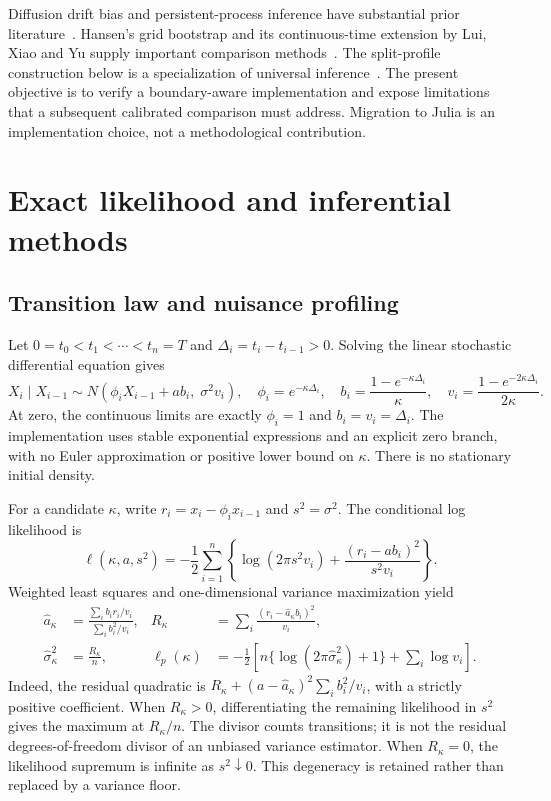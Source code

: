 \documentclass[11pt]{article}
\begin{document}
Diffusion drift bias and persistent-process inference have substantial prior
literature~\cite{tangchen,yu}. Hansen's grid bootstrap and its continuous-time
extension by Lui, Xiao and Yu supply important comparison
methods~\cite{hansen,lui}. The split-profile construction below is a
specialization of universal inference~\cite{universal}. The present objective
is to verify a boundary-aware implementation and expose limitations that a
subsequent calibrated comparison must address. Migration to Julia is an
implementation choice, not a methodological contribution.

\section{Exact likelihood and inferential methods}
\subsection{Transition law and nuisance profiling}
Let $0=t_0<t_1<\cdots<t_n=T$ and $\Delta_i=t_i-t_{i-1}>0$. Solving the
linear stochastic differential equation gives
\begin{equation}
 X_i\mid X_{i-1}\sim
 N\!\left(\phi_iX_{i-1}+ab_i,\;\sigma^2v_i\right),
 \quad
 \phi_i=e^{-\kappa\Delta_i},\quad
 b_i=\frac{1-e^{-\kappa\Delta_i}}{\kappa},\quad
 v_i=\frac{1-e^{-2\kappa\Delta_i}}{2\kappa}.
 \label{eq:transition}
\end{equation}
At zero, the continuous limits are exactly
$\phi_i=1$ and $b_i=v_i=\Delta_i$. The implementation uses stable exponential
expressions and an explicit zero branch, with no Euler approximation or
positive lower bound on $\kappa$. There is no stationary initial density.

For a candidate $\kappa$, write $r_i=x_i-\phi_i x_{i-1}$ and $s^2=\sigma^2$.
The conditional log likelihood is
\[
 \ell(\kappa,a,s^2)=-\frac12\sum_{i=1}^n
 \left\{\log(2\pi s^2v_i)+\frac{(r_i-ab_i)^2}{s^2v_i}\right\}.
\]
Weighted least squares and one-dimensional variance maximization yield
\begin{align}
 \widehat a_\kappa
 &=\frac{\sum_i b_ir_i/v_i}{\sum_i b_i^2/v_i},&
 R_\kappa&=\sum_i\frac{(r_i-\widehat a_\kappa b_i)^2}{v_i},
 \label{eq:profile-estimates}\\
 \widehat\sigma^2_\kappa&=\frac{R_\kappa}{n},&
 \ell_p(\kappa)&=-\frac12\left[
 n\{\log(2\pi\widehat\sigma^2_\kappa)+1\}+\sum_i\log v_i\right].
 \label{eq:profile}
\end{align}
Indeed, the residual quadratic is
$R_\kappa+(a-\widehat a_\kappa)^2\sum_i b_i^2/v_i$, with a strictly positive
coefficient. When $R_\kappa>0$, differentiating the remaining likelihood in
$s^2$ gives the maximum at $R_\kappa/n$. The divisor counts transitions; it is
not the residual degrees-of-freedom divisor of an unbiased variance estimator.
When $R_\kappa=0$, the likelihood supremum is infinite as $s^2\downarrow0$.
This degeneracy is retained rather than replaced by a variance floor.
\end{document}
